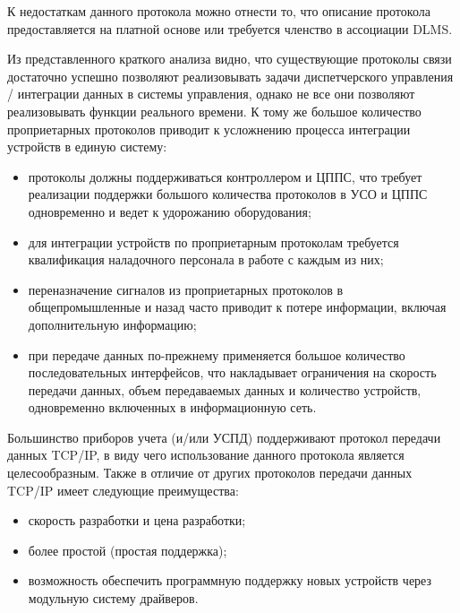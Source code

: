 К недостаткам данного протокола можно отнести то, что описание протокола предоставляется на платной основе или требуется членство в ассоциации DLMS.

Из представленного краткого анализа видно, что существующие протоколы связи достаточно успешно позволяют реализовывать задачи диспетчерского управления / интеграции данных в системы управления, однако не все они позволяют реализовывать функции реального времени. К тому же большое количество проприетарных протоколов приводит к усложнению процесса интеграции устройств в единую систему: 
\begin{itemize}
 \item протоколы должны поддерживаться контроллером и ЦППС, что требует реализации поддержки большого количества протоколов в УСО и ЦППС одновременно и ведет к удорожанию оборудования;
 \item для интеграции устройств по проприетарным протоколам требуется квалификация наладочного персонала в работе с каждым из них;
 \item переназначение сигналов из проприетарных протоколов в общепромышленные и назад часто приводит к потере информации, включая дополнительную информацию;
 \item при передаче данных по-прежнему применяется большое количество последовательных интерфейсов, что накладывает ограничения на скорость передачи данных, объем передаваемых данных и количество устройств, одновременно включенных в информационную сеть.
\end{itemize}

Большинство приборов учета (и/или УСПД) поддерживают протокол передачи данных TCP/IP, в виду чего использование данного протокола является целесообразным. Также в отличие от других протоколов передачи данных TCP/IP имеет следующие преимущества:

\begin{itemize}
 \item скорость разработки и цена разработки;
 \item более простой (простая поддержка);
 \item возможность обеспечить программную поддержку новых устройств через модульную систему драйверов.
\end{itemize}